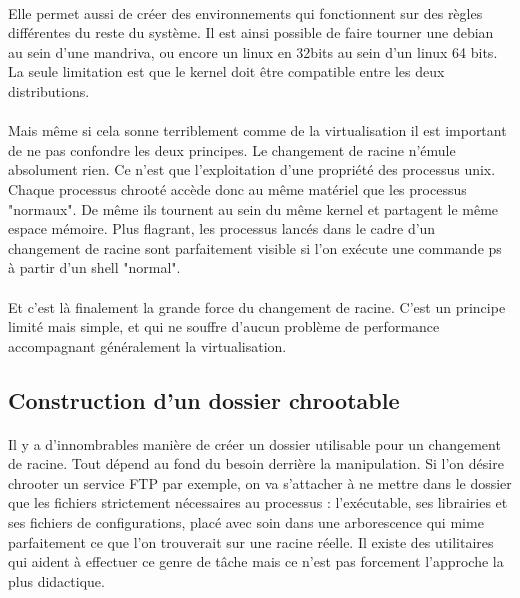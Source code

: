 \documentclass{article}
\begin{document}
\paragraph{}Elle permet aussi de créer des environnements qui fonctionnent sur des règles différentes du reste du système. Il est ainsi possible de faire tourner une debian au sein d'une mandriva, ou encore un linux en 32bits au sein d'un linux 64 bits. La seule limitation est que le kernel doit être compatible entre les deux distributions.
\paragraph{}Mais même si cela sonne terriblement comme de la virtualisation il est important de ne pas confondre les deux principes. Le changement de racine n'émule absolument rien. Ce n'est que l'exploitation d'une propriété des processus unix. Chaque processus chrooté accède donc au même matériel que les processus "normaux". De même ils tournent au sein du même kernel et partagent le même espace mémoire. Plus flagrant, les processus lancés dans le cadre d'un changement de racine sont parfaitement visible si l'on exécute une commande ps à partir d'un shell "normal".
\paragraph{}Et c'est là finalement la grande force du changement de racine. C'est un principe limité mais simple, et qui ne souffre d'aucun problème de performance accompagnant généralement la virtualisation.

\subsection{Construction d'un dossier chrootable}
\paragraph{}Il y a d'innombrables manière de créer un dossier utilisable pour un changement de racine. Tout dépend au fond du besoin derrière la manipulation. Si l'on désire chrooter un service FTP par exemple, on va s'attacher à ne mettre dans le dossier que les fichiers strictement nécessaires au processus : l'exécutable, ses librairies et ses fichiers de configurations, placé avec soin dans une arborescence qui mime parfaitement ce que l'on trouverait sur une racine réelle. Il existe des utilitaires qui aident à effectuer ce genre de tâche mais ce n'est pas forcement l'approche la plus didactique.
\end{document}
